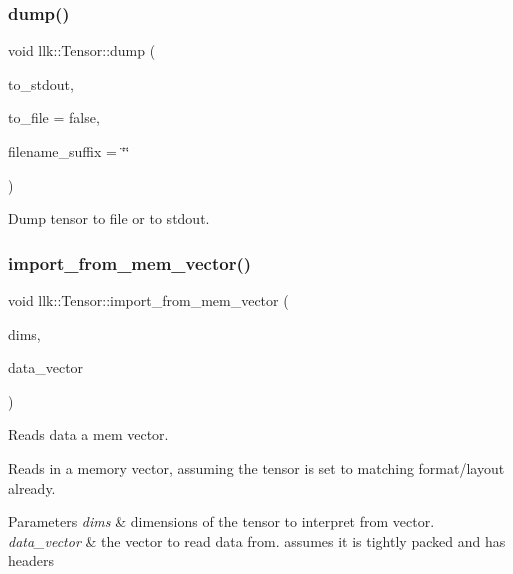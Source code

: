 \subsubsection{\texorpdfstring{dump()}{dump()}}
{\footnotesize\ttfamily void llk\+::\+Tensor\+::dump (\begin{DoxyParamCaption}\item[{bool}]{to\+\_\+stdout,  }\item[{bool}]{to\+\_\+file = {\ttfamily false},  }\item[{std\+::string}]{filename\+\_\+suffix = {\ttfamily \char`\"{}\char`\"{}} }\end{DoxyParamCaption})}



Dump tensor to file or to stdout. 

\mbox{\label{classllk_1_1Tensor_a880292b460f36aab01d3955097af1d3e}} 
\subsubsection{\texorpdfstring{import\+\_\+from\+\_\+mem\+\_\+vector()}{import\_from\_mem\_vector()}}
{\footnotesize\ttfamily void llk\+::\+Tensor\+::import\+\_\+from\+\_\+mem\+\_\+vector (\begin{DoxyParamCaption}\item[{\hyperlink{structllk_1_1TensorDims}{Tensor\+Dims}}]{dims,  }\item[{std\+::vector$<$ uint32\+\_\+t $>$ \&}]{data\+\_\+vector }\end{DoxyParamCaption})}



Reads data a mem vector. 

Reads in a memory vector, assuming the tensor is set to matching format/layout already. 
\begin{DoxyParams}{Parameters}
{\em dims} & dimensions of the tensor to interpret from vector. \\
\hline
{\em data\+\_\+vector} & the vector to read data from. assumes it is tightly packed and has headers \\
\hline
\end{DoxyParams}
\mbox{\label{classllk_1_1Tensor_a021595eb6c130bffd81edfb4b39435db}} 
